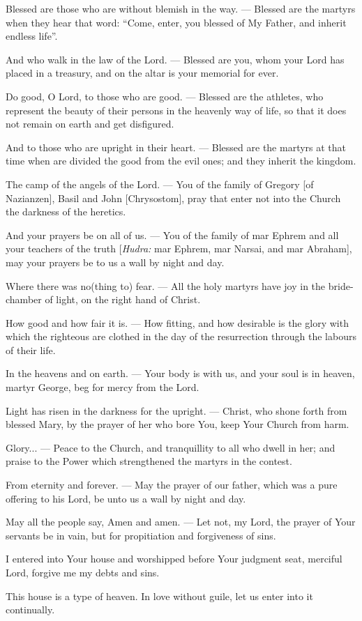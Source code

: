 \documentclass[12pt,twoside,a5paper]{article}
\begin{document}
\begin{halfparskip}
  Blessed are those who are without blemish in the way. --- Blessed are the martyrs when they hear that word: ``Come, enter, you blessed of My Father, and inherit endless life''.

  And who walk in the law of the Lord. --- Blessed are you, whom your Lord has placed in a treasury, and on the altar is your memorial for ever.

  Do good, O Lord, to those who are good. --- Blessed are the athletes, who represent the beauty of their persons in the heavenly way of life, so that it does not remain on earth and get disfigured.

  And to those who are upright in their heart. --- Blessed are the martyrs at that time when are divided the good from the evil ones; and they inherit the kingdom.

  The camp of the angels of the Lord. --- You of the family of Gregory [of Nazianzen], Basil and John [Chrysostom], pray that enter not into the Church the darkness of the heretics.

  And your prayers be on all of us. --- You of the family of mar Ephrem and all your teachers of the truth [\emph{Hudra:} mar Ephrem, mar Narsai, and mar Abraham], may your prayers be to us a wall by night and day.

  Where there was no(thing to) fear. --- All the holy martyrs have joy in the bride-chamber of light, on the right hand of Christ.

  How good and how fair it is. --- How fitting, and how desirable is the glory with which the righteous are clothed in the day of the resurrection through the labours of their life.

  In the heavens and on earth. --- Your body is with us, and your soul is in heaven, martyr George, beg for mercy from the Lord.

  Light has risen in the darkness for the upright. --- Christ, who shone forth from blessed Mary, by the prayer of her who bore You, keep Your Church from harm.

  Glory... --- Peace to the Church, and tranquillity to all who dwell in her; and praise to the Power which strengthened the martyrs in the contest.

  From eternity and forever. --- May the prayer of our father, which was a pure offering to his Lord, be unto us a wall by night and day.

  May all the people say, Amen and amen. --- Let not, my Lord, the prayer of Your servants be in vain, but for propitiation and forgiveness of sins.

  I entered into Your house and worshipped before Your judgment seat, merciful Lord, forgive me my debts and sins.

  This house is a type of heaven. In love without guile, let us enter into it continually.
\end{halfparskip}
\end{document}
